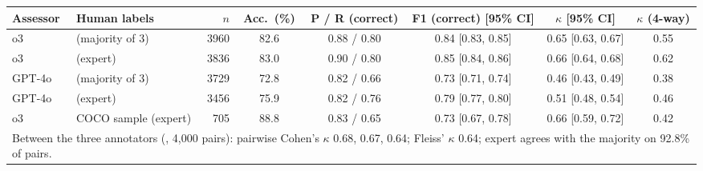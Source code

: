 \begin{tabular}{ll r c c c c c}
\toprule
Assessor & Human labels & $n$ & Acc.\ (\%) & P / R (correct) & F1 (correct) [95\% CI] & $\kappa$ [95\% CI] & $\kappa$ (4-way)\\
\midrule
o3 & \itot{} (majority of 3) & 3960 & 82.6 & 0.88 / 0.80 & 0.84 [0.83, 0.85] & 0.65 [0.63, 0.67] & 0.55 \\
o3 & \ttoi{} (expert) & 3836 & 83.0 & 0.90 / 0.80 & 0.85 [0.84, 0.86] & 0.66 [0.64, 0.68] & 0.62 \\
GPT-4o & \itot{} (majority of 3) & 3729 & 72.8 & 0.82 / 0.66 & 0.73 [0.71, 0.74] & 0.46 [0.43, 0.49] & 0.38 \\
GPT-4o & \ttoi{} (expert) & 3456 & 75.9 & 0.82 / 0.76 & 0.79 [0.77, 0.80] & 0.51 [0.48, 0.54] & 0.46 \\
o3 & COCO sample (expert) & 705 & 88.8 & 0.83 / 0.65 & 0.73 [0.67, 0.78] & 0.66 [0.59, 0.72] & 0.42 \\
\midrule
\multicolumn{8}{l}{\footnotesize Between the three annotators (\itot{}, 4,000 pairs): pairwise Cohen's $\kappa$ 0.68, 0.67, 0.64; Fleiss' $\kappa$ 0.64; expert agrees with the majority on 92.8\% of pairs.}\\
\bottomrule
\end{tabular}
